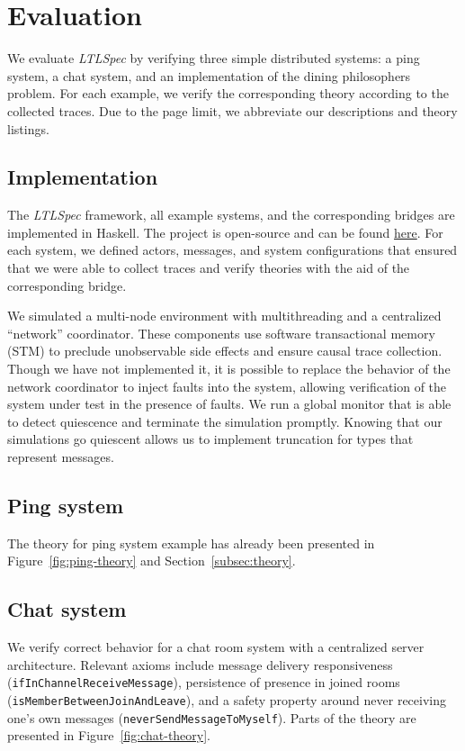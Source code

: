 \documentclass[format=acmsmall, nonacm=true, review=true, screen=true]{acmart}
\newcommand{\ltlspec}{\textit{LTLSpec}\xspace}
\begin{document}
\section{Evaluation}

We evaluate \ltlspec by verifying three simple distributed systems: a ping system, a chat system, and an implementation of the dining philosophers problem. For each example, we verify the corresponding theory according to the collected traces. Due to the page limit, we abbreviate our descriptions and theory listings.

\subsection{Implementation}

The \ltlspec framework, all example systems, and the corresponding bridges are implemented in Haskell.
The project is open-source and can be found \href{https://github.com/ejconlon/ltlspec}{here}.
For each system, we defined actors, messages, and system configurations that ensured that we were able to collect traces and verify theories with the aid of the corresponding bridge.

We simulated a multi-node environment with multithreading and a centralized ``network'' coordinator.
These components use software transactional memory (STM) \cite{harris2005composable} to preclude unobservable side effects and ensure causal trace collection.
Though we have not implemented it, it is possible to replace the behavior of the network coordinator to inject faults into the system, allowing verification of the system under test in the presence of faults.
We run a global monitor that is able to detect quiescence and terminate the simulation promptly. Knowing that our simulations go quiescent allows us to implement truncation for types that represent messages.

\subsection{Ping system}

The theory for ping system example has already been presented in Figure~\ref{fig:ping-theory} and Section~\ref{subsec:theory}.

\subsection{Chat system}

We verify correct behavior for a chat room system with a centralized server architecture.
Relevant axioms include message delivery responsiveness (\texttt{ifInChannelReceiveMessage}), persistence of presence in joined rooms (\texttt{isMemberBetweenJoinAndLeave}), and a safety property around never receiving one's own messages (\texttt{neverSendMessageToMyself}). Parts of the theory are presented in Figure~\ref{fig:chat-theory}.
\end{document}

